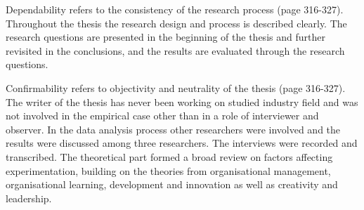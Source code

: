 Dependability refers to the consistency of the research process \citep{lincoln1985naturalistic} (page 316-327). Throughout the thesis the research design and process is described clearly. The research questions are presented in the beginning of the thesis and further revisited in the conclusions, and the results are evaluated through the research questions. 

Confirmability refers to objectivity and neutrality of the thesis \citep{lincoln1985naturalistic} (page 316-327). The writer of the thesis has never been working on studied industry field and was not involved in the empirical case other than in a role of interviewer and observer. In the data analysis process other researchers were involved and the results were discussed among three researchers. The interviews were recorded and transcribed. The theoretical part formed a broad review on factors affecting experimentation, building on the theories from organisational management, organisational learning, development and innovation as well as creativity and leadership. 


